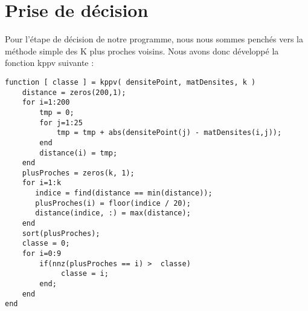 \section{Prise de décision}

Pour l'étape de décision de notre programme, nous nous sommes penchés vers la méthode simple des K plus proches voisins. Nous avons donc développé la 
fonction kppv suivante :
\\
\begin{lstlisting}
function [ classe ] = kppv( densitePoint, matDensites, k )
    distance = zeros(200,1);
    for i=1:200
        tmp = 0;
        for j=1:25
            tmp = tmp + abs(densitePoint(j) - matDensites(i,j));
        end
        distance(i) = tmp;
    end
    plusProches = zeros(k, 1);
    for i=1:k
       indice = find(distance == min(distance));
       plusProches(i) = floor(indice / 20);
       distance(indice, :) = max(distance);
    end
    sort(plusProches);
    classe = 0;
    for i=0:9
        if(nnz(plusProches == i) >  classe)
             classe = i;
        end;
    end
end
\end{lstlisting}
